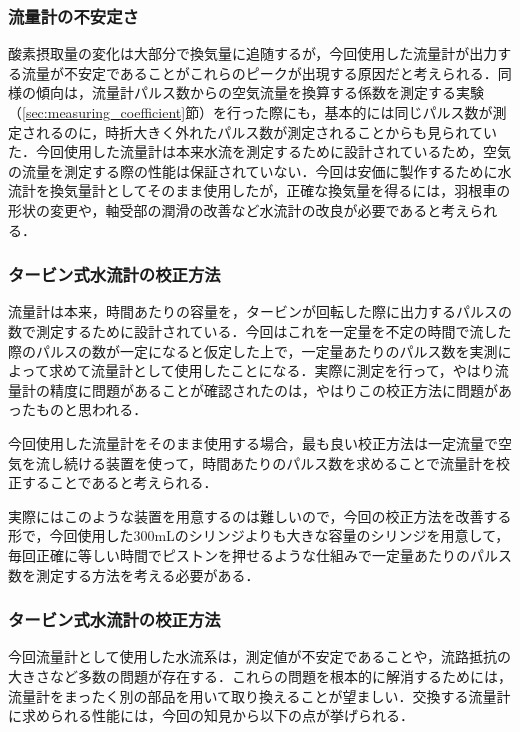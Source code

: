 \subsubsection{流量計の不安定さ}

酸素摂取量の変化は大部分で換気量に追随するが，今回使用した流量計が出力する流量が不安定であることがこれらのピークが出現する原因だと考えられる．同様の傾向は，流量計パルス数からの空気流量を換算する係数を測定する実験（\ref{sec:measuring_coefficient}節）を行った際にも，基本的には同じパルス数が測定されるのに，時折大きく外れたパルス数が測定されることからも見られていた．今回使用した流量計は本来水流を測定するために設計されているため，空気の流量を測定する際の性能は保証されていない．今回は安価に製作するために水流計を換気量計としてそのまま使用したが，正確な換気量を得るには，羽根車の形状の変更や，軸受部の潤滑の改善など水流計の改良が必要であると考えられる．

\subsubsection{タービン式水流計の校正方法}

流量計は本来，時間あたりの容量を，タービンが回転した際に出力するパルスの数で測定するために設計されている．今回はこれを一定量を不定の時間で流した際のパルスの数が一定になると仮定した上で，一定量あたりのパルス数を実測によって求めて流量計として使用したことになる．実際に測定を行って，やはり流量計の精度に問題があることが確認されたのは，やはりこの校正方法に問題があったものと思われる．

今回使用した流量計をそのまま使用する場合，最も良い校正方法は一定流量で空気を流し続ける装置を使って，時間あたりのパルス数を求めることで流量計を校正することであると考えられる．

実際にはこのような装置を用意するのは難しいので，今回の校正方法を改善する形で，今回使用した300mLのシリンジよりも大きな容量のシリンジを用意して，毎回正確に等しい時間でピストンを押せるような仕組みで一定量あたりのパルス数を測定する方法を考える必要がある．

\subsubsection{タービン式水流計の校正方法}

今回流量計として使用した水流系は，測定値が不安定であることや，流路抵抗の大きさなど多数の問題が存在する．これらの問題を根本的に解消するためには，流量計をまったく別の部品を用いて取り換えることが望ましい．交換する流量計に求められる性能には，今回の知見から以下の点が挙げられる．

